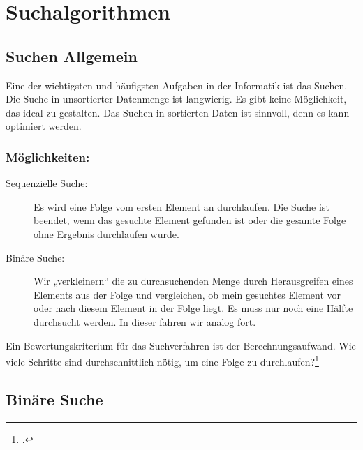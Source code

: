 \documentclass{lehramt-informatik-haupt}
\begin{document}

\chapter{Suchalgorithmen}

%

\section{Suchen Allgemein}

Eine der wichtigsten und häufigsten Aufgaben in der Informatik ist das
Suchen.
%
Die Suche in unsortierter Datenmenge ist langwierig. Es gibt keine
Möglichkeit, das ideal zu gestalten.
%
Das Suchen in sortierten Daten ist sinnvoll, denn es kann optimiert
werden.

\subsection{Möglichkeiten:}

\begin{description}
\item[Sequenzielle Suche:] Es wird eine Folge vom ersten Element an
durchlaufen. Die Suche ist beendet, wenn das gesuchte Element gefunden
ist oder die gesamte Folge ohne Ergebnis durchlaufen wurde.

\item[Binäre Suche:] Wir „verkleinern“ die zu durchsuchenden Menge durch
Herausgreifen eines Elements aus der Folge und vergleichen, ob mein
gesuchtes Element vor oder nach diesem Element in der Folge liegt. Es
muss nur noch eine Hälfte durchsucht werden. In dieser fahren wir analog
fort.
\end{description}

Ein Bewertungskriterium für das Suchverfahren ist der
Berechnungsaufwand. Wie viele Schritte sind durchschnittlich nötig, um
eine Folge zu durchlaufen?\footcite[Seite 16 (PDF 8)]{aud:fs:2}

%

\section{Binäre Suche}
\end{document}
